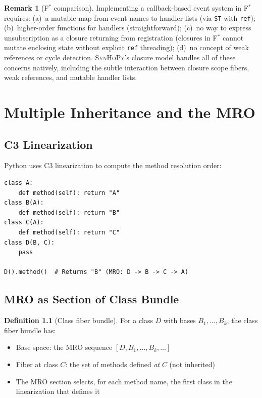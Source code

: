 \documentclass[11pt,a4paper]{report}
\theoremstyle{definition}
\newtheorem{definition}{Definition}[chapter]
\newtheorem{remark}[definition]{Remark}
\theoremstyle{plain}
\newcommand{\fstar}{F$^{*}$}
\newcommand{\synhopy}{\textsc{SynHoPy}}
\begin{document}
\begin{remark}[\fstar{} comparison]
Implementing a callback-based event system in \fstar{} requires:
(a)~a mutable map from event names to handler lists
  (via \lstinline[style=fstar]|ST| with \lstinline[style=fstar]|ref|);
(b)~higher-order functions for handlers (straightforward);
(c)~no way to express unsubscription as a closure returning from
  registration (closures in \fstar{} cannot mutate enclosing state
  without explicit \lstinline[style=fstar]|ref| threading);
(d)~no concept of weak references or cycle detection.
\synhopy{}'s closure model handles all of these concerns natively,
including the subtle interaction between closure scope fibers,
weak references, and mutable handler lists.
\end{remark}


\chapter{Multiple Inheritance and the MRO}
\label{ch:mro}

\section{C3 Linearization}

Python uses C3 linearization to compute the method resolution order:

\begin{lstlisting}[style=python]
class A:
    def method(self): return "A"
class B(A):
    def method(self): return "B"
class C(A):
    def method(self): return "C"
class D(B, C):
    pass

D().method()  # Returns "B" (MRO: D -> B -> C -> A)
\end{lstlisting}

\section{MRO as Section of Class Bundle}

\begin{definition}[Class fiber bundle]
For a class $D$ with bases $B_1, \ldots, B_k$, the class fiber bundle has:
\begin{itemize}
  \item Base space: the MRO sequence $[D, B_1, \ldots, B_k, \ldots]$
  \item Fiber at class $C$: the set of methods defined \emph{at} $C$ (not inherited)
  \item The MRO section selects, for each method name, the first class in the
    linearization that defines it
\end{itemize}
\end{definition}
\end{document}
